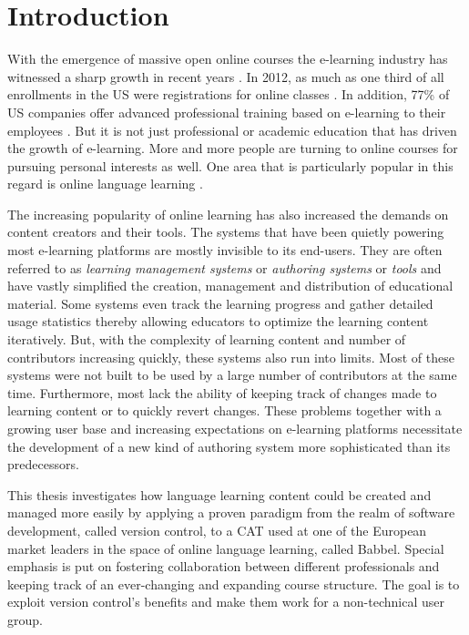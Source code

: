 \chapter{Introduction}
With the emergence of massive open online courses the e-learning industry has witnessed a sharp growth in recent years \cite{_e-learning_2014}. In 2012, as much as one third of all enrollments in the US were registrations for online classes \cite{allen_grade_2014}. In addition, 77\% of US companies offer advanced professional training based on e-learning to their employees \cite{vernau_corporate_2014}. But it is not just professional or academic education that has driven the growth of e-learning. More and more people are turning to online courses for pursuing personal interests as well. One area that is particularly popular in this regard is online language learning \cite{blake_current_2011,_its_2014}.



The increasing popularity of online learning has also increased the demands on content creators and their tools. The systems that have been quietly powering most e-learning platforms are mostly invisible to its end-users. They are often referred to as \textit{learning management systems} or \textit{authoring systems} or \textit{tools} and have vastly simplified the creation, management and distribution of educational material. Some systems even track the learning progress and gather detailed usage statistics thereby allowing educators to optimize the learning content iteratively. But, with the complexity of learning content and number of contributors increasing quickly, these systems also run into limits. Most of these systems were not built to be used by a large number of contributors at the same time. Furthermore, most lack the ability of keeping track of changes made to learning content or to quickly revert changes. These problems together with a growing user base and increasing expectations on e-learning platforms necessitate the development of a new kind of authoring system more sophisticated than its predecessors.

This thesis investigates how language learning content could be created and managed more easily by applying a proven paradigm from the realm of software development, called version control, to a \ac{CAT} used at one of the European market leaders in the space of online language learning, called Babbel. Special emphasis is put on fostering collaboration between different professionals and keeping track of an ever-changing and expanding course structure. The goal is to exploit version control's benefits and make them work for a non-technical user group.

